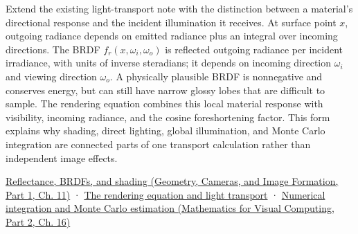 Extend the existing light-transport note with the distinction between a material's directional response and the incident illumination it receives. At surface point \(x\), outgoing radiance depends on emitted radiance plus an integral over incoming directions. The BRDF \(f_r(x,\omega_i,\omega_o)\) is reflected outgoing radiance per incident irradiance, with units of inverse steradians; it depends on incoming direction \(\omega_i\) and viewing direction \(\omega_o\). A physically plausible BRDF is nonnegative and conserves energy, but can still have narrow glossy lobes that are difficult to sample. The rendering equation combines this local material response with visibility, incoming radiance, and the cosine foreshortening factor. This form explains why shading, direct lighting, global illumination, and Monte Carlo integration are connected parts of one transport calculation rather than independent image effects.

\href{../03-Geometry-Cameras-and-Image-Formation-P01/main.pdf\#nameddest=03-visual-computing-i-ch004-reflectance-brdfs-and-shading}{Reflectance, BRDFs, and shading (Geometry, Cameras, and Image Formation, Part 1, Ch. 11)} · \hyperref[03-visual-computing-i-ch007-the-rendering-equation-and-light-transport]{The rendering equation and light transport} · \href{../02-Mathematics-for-Visual-Computing-P02/main.pdf\#nameddest=03-visual-computing-i-ch012-numerical-integration-and-monte-carlo-estimation}{Numerical integration and Monte Carlo estimation (Mathematics for Visual Computing, Part 2, Ch. 16)}
